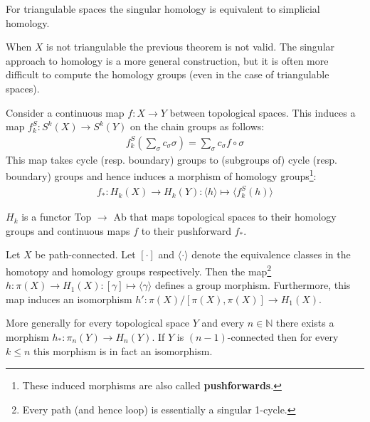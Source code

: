 
	\begin{theorem}
		For triangulable spaces the singular homology is equivalent to simplicial homology.
	\end{theorem}
	\begin{remark}
		When $X$ is not triangulable the previous theorem is not valid. The singular approach to homology is a more general construction, but it is often more difficult to compute the homology groups (even in the case of triangulable spaces).
	\end{remark}

	\begin{property}
		Consider a continuous map $f:X\rightarrow Y$ between topological spaces. This induces a map $f_k^S:S^k(X)\rightarrow S^k(Y)$ on the chain groups as follows:
		\begin{gather}
			f_k^S\left(\sum_\sigma c_\sigma\sigma\right) = \sum_\sigma c_\sigma f\circ\sigma
		\end{gather}
		This map takes cycle (resp. boundary) groups to (subgroups of) cycle (resp. boundary) groups and hence induces a morphism of homology groups\footnote{These induced morphisms are also called \textbf{pushforwards}.}:
		\begin{gather}
			f_\ast:H_k(X)\rightarrow H_k(Y):\langle h \rangle\mapsto \langle f_k^S(h) \rangle
		\end{gather}
	\end{property}
	\begin{result}
		$H_k$ is a functor Top $\rightarrow$ Ab that maps topological spaces to their homology groups and continuous maps $f$ to their pushforward $f_\ast$.
	\end{result}

	\begin{theorem}[Hurewicz]
		Let $X$ be path-connected. Let $[\cdot]$ and $\langle\cdot\rangle$ denote the equivalence classes in the homotopy and homology groups respectively. Then the map\footnote{Every path (and hence loop) is essentially a singular 1-cycle.} $h:\pi(X)\rightarrow H_1(X):[\gamma]\mapsto\langle\gamma\rangle$ defines a group morphism. Furthermore, this map induces an isomorphism $h':\pi(X)/[\pi(X), \pi(X)]\rightarrow H_1(X)$.

		More generally for every topological space $Y$ and every $n\in\mathbb{N}$ there exists a morphism $h_*:\pi_n(Y)\rightarrow H_n(Y)$. If $Y$ is $(n-1)$-connected then for every $k\leq n$ this morphism is in fact an isomorphism.
	\end{theorem}

